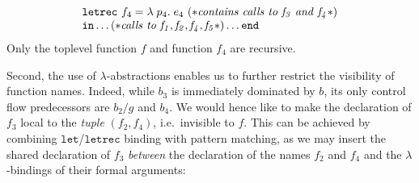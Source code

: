 \begin{equation}
\begin{array}{l}
\begin{array}{l}
\begin{array}[t]{l}
\begin{array}[t]{l}
\begin{array}[t]{l}
                \begin{array}[t]{l}
                  \mathtt{letrec}\ f_4 = \lambda\; p_4.\; e_4\
                    (* \mathit{contains\ calls\ to\ f_3\ and\ f_4}*) \\
                   \mathtt{in} \ldots 
                      (* \mathit{calls\ to\ f_1, f_2, f_4, f_5}*)
                   \ldots \mathtt{end}
                \end{array}
              \end{array}
            \end{array}
          \end{array}
        \end{array}
  \end{array}
\end{equation}
Only the toplevel function $f$ and function $f_4$ are recursive.

Second, the use of $\lambda$-abstractions enables us to further
restrict the visibility of function names. Indeed, while $b_3$ is
immediately dominated by $b$, its only control flow predecessors are
$b_2/g$ and $b_4$. We would hence like to make the declaration of
$f_3$ local to the \emph{tuple} $(f_2, f_4)$, i.e.~invisible to $f$.
This can be achieved by combining $\mathtt{let}$/$\mathtt{letrec}$
binding with pattern matching, as we may insert the shared declaration
of $f_3$ \emph{between} the declaration of the names $f_2$ and $f_4$
and the $\lambda$-bindings of their formal arguments:

